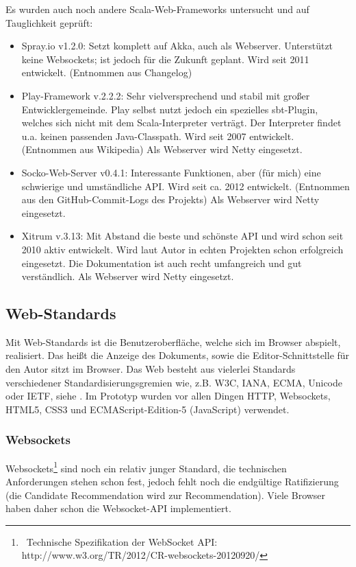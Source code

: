 
Es wurden auch noch andere Scala-Web-Frameworks untersucht und auf Tauglichkeit geprüft:

 
\begin{itemize}

\item Spray.io v1.2.0: Setzt komplett auf Akka, auch als Webserver. Unterstützt keine Websockets; ist jedoch für die Zukunft geplant. Wird seit 2011 entwickelt. (Entnommen aus Changelog)
\item Play-Framework v.2.2.2: Sehr vielversprechend und stabil mit großer Entwicklergemeinde. Play selbst nutzt jedoch ein spezielles sbt-Plugin, welches sich nicht mit dem Scala-Interpreter verträgt. Der Interpreter findet u.a. keinen passenden Java-Classpath. Wird seit 2007 entwickelt. (Entnommen aus Wikipedia) Als Webserver wird Netty eingesetzt.
\item Socko-Web-Server v0.4.1: Interessante Funktionen, aber (für mich) eine schwierige und umständliche API. Wird seit ca. 2012 entwickelt. (Entnommen aus den GitHub-Commit-Logs des Projekts) Als Webserver wird Netty eingesetzt.
\item Xitrum v.3.13: Mit Abstand die beste und schönste API und wird schon seit 2010 aktiv entwickelt. Wird laut Autor in echten Projekten schon erfolgreich eingesetzt. Die Dokumentation ist auch recht umfangreich und gut verständlich. Als Webserver wird Netty eingesetzt.
\end{itemize}
 
\subsection{Web-Standards}\label{}
 
Mit Web-Standards ist die Benutzeroberfläche, welche sich im Browser abspielt, realisiert. Das heißt die Anzeige des Dokuments, sowie die Editor-Schnittstelle für den Autor sitzt im Browser. Das Web besteht aus vielerlei Standards verschiedener Standardisierungsgremien wie, z.B. W3C, IANA, ECMA, Unicode oder IETF, siehe \citep[S.~6]{Sikos}. Im Prototyp wurden vor allen Dingen HTTP, Websockets, HTML5, CSS3 und ECMAScript-Edition-5 (JavaScript) verwendet.

 
\subsubsection{Websockets}\label{}

 
Websockets\footnote{~Technische Spezifikation der WebSocket API: http://www.w3.org/TR/2012/CR-websockets-20120920/} sind noch ein relativ junger Standard, die technischen Anforderungen stehen schon fest, jedoch fehlt noch die endgültige Ratifizierung (die Candidate Recommendation wird zur Recommendation). Viele Browser haben daher schon die Websocket-API implementiert.


